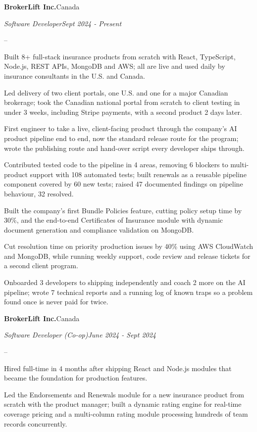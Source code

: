 \documentclass[10pt,letterpaper]{article}
\newcommand{\roleheading}[4]{%
  \vspace{2pt}%
  \textbf{#1}\hfill #2\par
  \textit{#3}\hfill \textit{#4}\par
  \vspace{1pt}%
}
\newenvironment{bullets}{%
  \begin{list}{--}{%
    \setlength{\leftmargin}{14pt}\setlength{\labelwidth}{8pt}\setlength{\labelsep}{6pt}%
    \setlength{\itemsep}{1pt}\setlength{\parsep}{0pt}\setlength{\topsep}{2pt}\setlength{\partopsep}{0pt}}%
}{\end{list}}
\begin{document}
\roleheading{BrokerLift Inc.}{Canada}{Software Developer}{Sept 2024 - Present}
\begin{bullets}
  \item Built 8+ full-stack insurance products from scratch with React, TypeScript, Node.js, REST APIs, MongoDB and AWS; all are live and used daily by insurance consultants in the U.S. and Canada.
  \item Led delivery of two client portals, one U.S. and one for a major Canadian brokerage; took the Canadian national portal from scratch to client testing in under 3 weeks, including Stripe payments, with a second product 2 days later.
  \item First engineer to take a live, client-facing product through the company's AI product pipeline end to end, now the standard release route for the program; wrote the publishing route and hand-over script every developer ships through.
  \item Contributed tested code to the pipeline in 4 areas, removing 6 blockers to multi-product support with 108 automated tests; built renewals as a reusable pipeline component covered by 60 new tests; raised 47 documented findings on pipeline behaviour, 32 resolved.
  \item Built the company's first Bundle Policies feature, cutting policy setup time by 30\%, and the end-to-end Certificates of Insurance module with dynamic document generation and compliance validation on MongoDB.
  \item Cut resolution time on priority production issues by 40\% using AWS CloudWatch and MongoDB, while running weekly support, code review and release tickets for a second client program.
  \item Onboarded 3 developers to shipping independently and coach 2 more on the AI pipeline; wrote 7 technical reports and a running log of known traps so a problem found once is never paid for twice.
\end{bullets}

\roleheading{BrokerLift Inc.}{Canada}{Software Developer (Co-op)}{June 2024 - Sept 2024}
\begin{bullets}
  \item Hired full-time in 4 months after shipping React and Node.js modules that became the foundation for production features.
  \item Led the Endorsements and Renewals module for a new insurance product from scratch with the product manager; built a dynamic rating engine for real-time coverage pricing and a multi-column rating module processing hundreds of team records concurrently.
\end{bullets}
\end{document}
